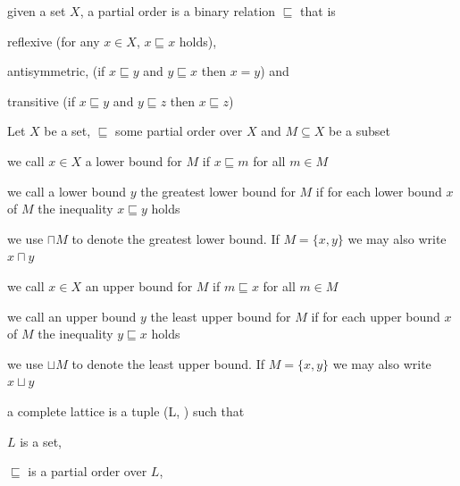 \documentclass[landscape, a4paper]{article}
\begin{document}
\begin{minipage}[t]{0.2\linewidth}
\begin{betterlist}
	\end{betterlist}
	\begin{betterlist}
		\item given a set $X$, a partial order is a binary relation $\sqsubseteq$ that is
		\begin{betterlist}
			\item reflexive (for any $x \in X$, $x \sqsubseteq x$ holds),
			\item antisymmetric, (if $x \sqsubseteq y$ and $y \sqsubseteq x$ then $x = y$) and
			\item transitive (if $x \sqsubseteq y$ and $y \sqsubseteq z$ then $x \sqsubseteq z$)
			\item {}
		\end{betterlist}
		\item Let $X$ be a set, $\sqsubseteq$ some partial order over $X$ and $M \subseteq X$ be a subset
		\begin{betterlist}
			\item we call $x \in X$ a \alert{lower bound} for $M$ if $x \sqsubseteq m$ for all $m \in M$
			\item we call a lower bound $y$ the \alert{greatest lower bound} for $M$ if for each lower bound $x$ of $M$ the inequality $x \sqsubseteq y$ holds
			\begin{betterlist}
				\item we use $\sqcap M$ to denote the \alert{greatest lower bound}. If $M = \{x, y\}$ we may also write $x \sqcap y$
			\end{betterlist}
			\item we call $x \in X$ an \alert{upper bound} for $M$ if $m \sqsubseteq x$ for all $m \in M$
			\item we call an upper bound $y$ the \alert{least upper bound} for $M$ if for each upper bound $x$ of $M$ the inequality $y \sqsubseteq x$ holds
			\begin{betterlist}
				\item we use $\sqcup M$ to denote the \alert{least upper bound}. If $M = \{x, y\}$ we may also write $x \sqcup y$
			\end{betterlist}
		\end{betterlist}
		\item a \alert{complete lattice} is a tuple (L, \sqsubseteq ) such that
		\begin{betterlist}
			\item $L$ is a set,
			\item $\sqsubseteq $ is a \alert{partial order} over $L$,

\end{betterlist}
\end{betterlist}
\end{minipage}
\end{document}
